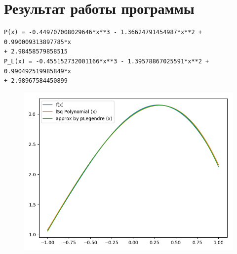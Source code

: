 \documentclass[12pt,a4paper]{article}
\begin{document}
\section{Результат работы программы}
\begin{verbatim}
P(x) = -0.449707008029646*x**3 - 1.36624791454987*x**2 + 0.990009313897785*x
+ 2.98458579858515
P_L(x) = -0.455152732001166*x**3 - 1.39578867025591*x**2 + 0.990492519985849*x
+ 2.98967584450899
\end{verbatim}
\begin{figure}[h]
\includegraphics[width=\linewidth]{1.png}
\caption{}
\label{fig:}
\end{figure}\\
\end{document}

